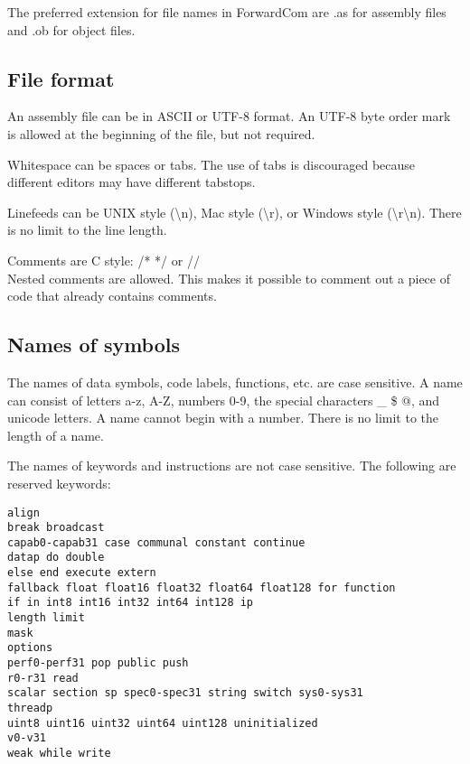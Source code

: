 \documentclass[forwardcom.tex]{subfiles}
\begin{document}
The preferred extension for file names in ForwardCom are .as for assembly files and .ob for object files.
\vspace{2mm}


\subsection{File format} \label{assemblyFileFormat}
An assembly file can be in ASCII or UTF-8 format. An UTF-8 byte order mark is allowed at the beginning of the file, but not required.
\vspace{2mm}

Whitespace can be spaces or tabs. The use of tabs is discouraged because different editors may have different tabstops.
\vspace{2mm}

Linefeeds can be UNIX style (\textbackslash n), Mac style (\textbackslash r), or Windows style (\textbackslash r\textbackslash n). There is no limit to the line length.
\vspace{2mm}

Comments are C style:  /* */ or // \\
Nested comments are allowed. This makes it possible to comment out a piece of code that already contains comments.
\vspace{2mm}


\subsection{Names of symbols} \label{assemblerNames}
The names of data symbols, code labels, functions, etc. are case sensitive. 
A name can consist of letters a-z, A-Z, numbers 0-9, the special characters \_ \$ @, 
and unicode letters. A name cannot begin with a number. There is no limit to the length of a name.
\vspace{2mm}

The names of keywords and instructions are not case sensitive.
The following are reserved keywords:
\begin{lstlisting}[frame=single]
align 
break broadcast
capab0-capab31 case communal constant continue
datap do double 
else end execute extern 
fallback float float16 float32 float64 float128 for function 
if in int8 int16 int32 int64 int128 ip 
length limit
mask
options
perf0-perf31 pop public push
r0-r31 read
scalar section sp spec0-spec31 string switch sys0-sys31
threadp 
uint8 uint16 uint32 uint64 uint128 uninitialized
v0-v31 
weak while write
\end{lstlisting}
\vspace{2mm}
\end{document}

